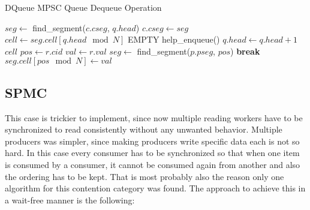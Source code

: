 \begin{algorithm}[!ht]
    \centering
    \captionsetup{justification=centering}
    \caption{DQueue \ac{MPSC} Queue Dequeue Operation \cite{WangCacheCoherent}}
    \label{alg:dqueue-dequeue}
    \scriptsize
    \begin{algorithmic}[1]
            \State $seg \gets$ find\_segment($c.cseg$, $q.head$)
                \State $c.cseg \gets seg$ 
            \EndIf
            \State $cell \gets seg.cell[q.head \mod N]$
             
                    \State \Return EMPTY
                \Else
                    \State help\_enqueue() 
                \EndIf
            \EndIf
            \State $q.head \gets q.head + 1$ 
            \State \Return $cell$
        \EndFunction
        \State
                    \State $pos \gets r.cid$
                    \State $val \gets r.val$
                    \State $seg \gets$ find\_segment($p.pseg$, $pos$)
                        \State \textbf{break} 
                    \EndIf
                        \State $seg.cell[pos \mod N] \gets val$ 
                    \EndIf
                \EndFor
            \EndFor
        \EndFunction
    \end{algorithmic}
\end{algorithm}

\subsection{\acf{SPMC}}\label{subsec:single-producer-and-multiple-consumer}
This case is trickier to implement, since now multiple reading workers have to be synchronized to read consistently without any unwanted behavior. Multiple producers was simpler, since making producers write specific data each is not so hard. In this case every consumer has to be synchronized so that when one item is consumed by a consumer, it cannot be consumed again from another and also the ordering has to be kept. That is most probably also the reason only one algorithm for this contention category was found. The approach to achieve this in a wait-free manner is the following:

